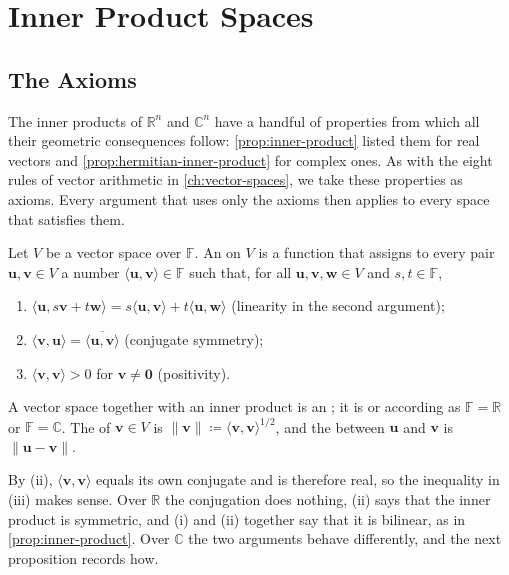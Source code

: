 \section{Inner Product Spaces}
\label{sec:inner-product-spaces}

\subsection{The Axioms}

The inner products of $\mathbb R^n$ and $\mathbb C^n$ have a handful of properties from which all their geometric consequences follow: \cref{prop:inner-product} listed them for real vectors and \cref{prop:hermitian-inner-product} for complex ones. As with the eight rules of vector arithmetic in \cref{ch:vector-spaces}, we take these properties as axioms. Every argument that uses only the axioms then applies to every space that satisfies them.

\begin{definition}
\label{def:inner-product-space}
Let $V$ be a vector space over $\mathbb F$. An  on $V$ is a function that assigns to every pair $\mathbf u,\mathbf v\in V$ a number $\langle\mathbf u,\mathbf v\rangle\in\mathbb F$ such that, for all $\mathbf u,\mathbf v,\mathbf w\in V$ and $s,t\in\mathbb F$,
\begin{enumerate}
\item $\langle\mathbf u,s\mathbf v+t\mathbf w\rangle=s\langle\mathbf u,\mathbf v\rangle+t\langle\mathbf u,\mathbf w\rangle$ (linearity in the second argument);
\item $\langle\mathbf v,\mathbf u\rangle=\overline{\langle\mathbf u,\mathbf v\rangle}$ (conjugate symmetry);
\item $\langle\mathbf v,\mathbf v\rangle>0$ for $\mathbf v\ne\mathbf 0$ (positivity).
\end{enumerate}
A vector space together with an inner product is an ; it is  or  according as $\mathbb F=\mathbb R$ or $\mathbb F=\mathbb C$. The  of $\mathbf v\in V$ is $\|\mathbf v\|\coloneqq\langle\mathbf v,\mathbf v\rangle^{1/2}$, and the  between $\mathbf u$ and $\mathbf v$ is $\|\mathbf u-\mathbf v\|$.
\end{definition}

By (ii), $\langle\mathbf v,\mathbf v\rangle$ equals its own conjugate and is therefore real, so the inequality in (iii) makes sense. Over $\mathbb R$ the conjugation does nothing, (ii) says that the inner product is symmetric, and (i) and (ii) together say that it is bilinear, as in \cref{prop:inner-product}. Over $\mathbb C$ the two arguments behave differently, and the next proposition records how.

